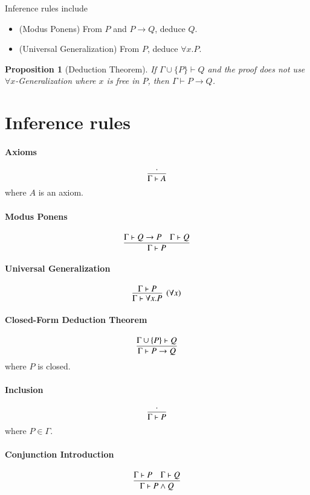 \documentclass{article}
\newtheorem{prop}{Proposition}
\begin{document}
Inference rules include
\begin{itemize}
\item (Modus Ponens) From $P$ and $P \to Q$, deduce $Q$.
\item (Universal Generalization) From $P$, deduce $\forall x . P$. 
\end{itemize}

\begin{prop}[Deduction Theorem]
If $\Gamma \cup \{P\} \vdash Q$ and the proof does not use $\forall x$-Generalization where $x$ is free in $P$, then $\Gamma \vdash P \to Q$. 
\end{prop}

\section{Inference rules}

\paragraph{Axioms}
$$
\infer{\Gamma \vdash A}{\cdot}
$$
where $A$ is an axiom. 

\paragraph{Modus Ponens}
$$
\infer{\Gamma \vdash P}
      {\Gamma \vdash Q \to P
      &\Gamma \vdash Q}
$$

\paragraph{Universal Generalization}
$$
\infer[(\forall x)]{\Gamma \vdash \forall x . P}
      {\Gamma \vdash P}
$$

\paragraph{Closed-Form Deduction Theorem}
$$
\infer{\Gamma \vdash P \to Q}
      {\Gamma \cup \{P\} \vdash Q}
$$
where $P$ is closed.

\paragraph{Inclusion}
$$
\infer{\Gamma \vdash P}{\cdot}
$$
where $P \in \Gamma$.

\paragraph{Conjunction Introduction}
$$
\infer{\Gamma \vdash P \wedge Q}
      {\Gamma \vdash P
      &\Gamma \vdash Q}
$$
\end{document}
